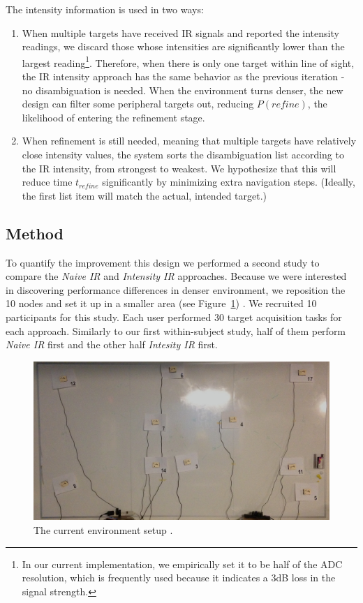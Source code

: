 The intensity information is used in two ways:
\begin{enumerate}
\item When multiple targets have received IR signals and reported the intensity readings, we discard those whose intensities are significantly lower than the largest reading\footnote{In our current implementation, we empirically set it to be half of the ADC resolution, which is frequently used because it indicates a 3dB loss in the signal strength.}. Therefore, when there is only one target within line of sight, the IR intensity approach has the same behavior as the previous iteration - no disambiguation is needed. When the environment turns denser, the new design can filter some peripheral targets out, reducing $P(refine)$, the likelihood of entering the refinement stage.
\item When refinement is still needed, meaning that multiple targets have relatively close intensity values, the system sorts the disambiguation list according to the IR intensity, from strongest to weakest. We hypothesize that this will reduce time $t_{refine}$ significantly by minimizing extra navigation steps. (Ideally, the first list item will match the actual, intended target.)
\end{enumerate}

\subsection{Method}
To quantify the improvement this design we performed a second study to compare the {\em Naive IR} and {\em Intensity IR} approaches. Because we were interested in discovering performance differences in denser environment, we reposition the 10 nodes and set it up in a smaller area (see Figure~\ref{fig:study-layout2}) . We recruited 10 participants for this study. Each  user performed 30 target acquisition tasks for each approach. Similarly to our first within-subject study, half of them perform {\em Naive IR} first and the other half {\em Intesity IR} first.

\begin{figure}[t]
\centering
\includegraphics[width=1.0\columnwidth]{figures/study-layout2.jpg}
\caption{The current environment setup  .}
\label{fig:study-layout2}
\end{figure}

